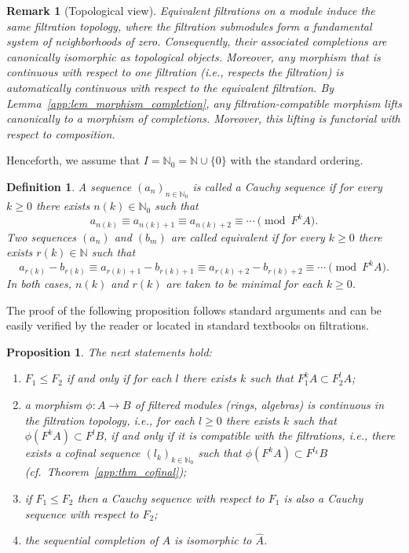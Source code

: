 \documentclass[a4paper,12pt]{amsart}
\newtheorem{deff}{Definition}
\newtheorem{proposition}{Proposition}
\newtheorem{rem}{Remark}
\newcommand{\N}{{\mathbb N}}
\begin{document}
\begin{rem}[Topological view]\label{app:top_remark}\normalfont
Equivalent filtrations on a module  induce the same \emph{filtration topology}, where the filtration submodules form a fundamental system of neighborhoods of zero. 
Consequently, their associated completions are canonically isomorphic as topological objects. Moreover, any morphism that is continuous with respect to one filtration (i.e., respects the filtration) is automatically continuous with respect to the equivalent filtration. 
By Lemma~\ref{app:lem_morphism_completion}, any filtration-compatible morphism lifts canonically to a morphism of completions. Moreover, this lifting is functorial with respect to composition.
\end{rem}


\smallskip\noindent   Henceforth, we assume that $I = \N_0=\N \cup \{0\}$ with the standard ordering. 

\begin{deff}\label{def:Cauchy}\normalfont
A sequence $(a_n)_{n \in \mathbb{N}_0}$ is called a \emph{Cauchy sequence} if for every $k \geq 0$ there exists $n(k) \in \mathbb{N}_0$ such that
\begin{equation}\label{eq:Cauchy_stability}
  a_{n(k)} \equiv a_{n(k)+1} \equiv a_{n(k)+2} \equiv \cdots \pmod{F^k A}.  
\end{equation}
Two sequences $(a_n)$ and $(b_m)$ are called \emph{equivalent} if for every $k \geq 0$ there exists $r(k) \in \mathbb{N}$ such that
\begin{equation}\label{eq:seq_equiv}
  a_{r(k)} - b_{r(k)} \equiv a_{r(k)+1} - b_{r(k)+1} \equiv a_{r(k)+2} - b_{r(k)+2} \equiv \cdots \pmod{F^k A}.  
\end{equation}
In both cases, $n(k)$ and $r(k)$ are taken to be minimal for each $k \geq 0$.
\end{deff}

\noindent The proof of the following proposition follows standard arguments and can be easily verified by the reader or located in standard textbooks on filtrations.

\begin{proposition}\label{prop:topology}\normalfont
    The next statements hold:
\begin{enumerate}
    \item $F_1\le F_2$ if and only if for each $l$ there exists $k$ such that $F_1^k A \subset F_2^l A$;
    \item a morphism $\phi \colon A \to B$ of filtered modules (rings, algebras) is \emph{continuous} in the filtration topology, i.e., for each $l \ge 0$ there exists $k$ such that $\phi(F^k A) \subset F^l B$, if and only if it is compatible with the filtrations, i.e., there exists a cofinal sequence $(l_k)_{k \in \mathbb{N}_0}$ such that $\phi(F^k A) \subset F^{l_k} B$ (cf.\ Theorem~\ref{app:thm_cofinal});
    \item if $F_1 \leq F_2$ then a Cauchy sequence with respect to $F_1$ is also a Cauchy sequence with respect to $F_2$;
    \item the sequential completion of $A$ is isomorphic to $\hat{A}$.
\end{enumerate}
\end{proposition}
\end{document}
